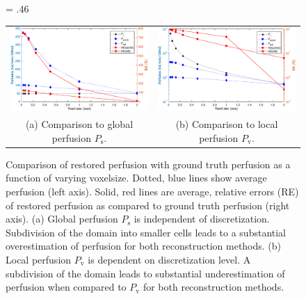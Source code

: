 \documentclass[final,5p,times,twocolumn]{elsarticle}
\begin{document}
    \begin{figure}[!htb]
    	\centering
    	\fwd = .46\textwidth
    	\begin{tabular}{c c}
    		\includegraphics[width=\fwd]{figs/E110_CBFOnDifferentResolutions_plot-Ps-scaleto-none.eps} & \includegraphics[width=\fwd]{figs/E110_CBFOnDifferentResolutions_plot-Pv-scaleto-none.eps}\\	
    		(a) Comparison to global perfusion $P_{\mathrm{s}}$. & (b) Comparison to local perfusion $P_{\mathrm{v}}$. \\
    	\end{tabular}
    	\caption{Comparison of restored perfusion with ground truth perfusion as a function of varying voxelsize. Dotted, blue lines show average perfusion (left axis). Solid, red lines are average, relative errors (RE) of restored perfusion as compared to ground truth perfusion (right axis). (a) Global perfusion $P_{\mathrm{s}}$ is independent of discretization.  Subdivision of the domain into smaller cells leads to a substantial overestimation of perfusion for both reconstruction methods. (b) Local perfusion $P_{\mathrm{v}}$ is dependent on discretization level. A subdivision of the domain leads to substantial underestimation of perfusion when compared to $P_{\mathrm{v}}$ for both reconstruction methods.}
            \label{fig:volnormperf}
    \end{figure}
    
\end{document}
